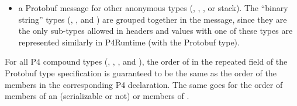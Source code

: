 \documentclass[11pt]{article}
\begin{document}
{\begin{itemize}
\item{}
a Protobuf message for other anonymous types (, , ,
 or stack). The \textquotedblleft{}binary string\textquotedblright{} types (, , and
) are grouped together in the  message,
since they are the only sub-types allowed in headers and values with one of
these types are represented similarly in P4Runtime (with the Protobuf 
type).%
\end{itemize}%

\noindent{}For all P4 compound types (, , , and ),
the order of  in the repeated field of the Protobuf type specification
is guaranteed to be the same as the order of the members in the corresponding
P4 declaration. The same goes for the order of members of an 
(serializable or not) or members of .%

}
\end{document}
